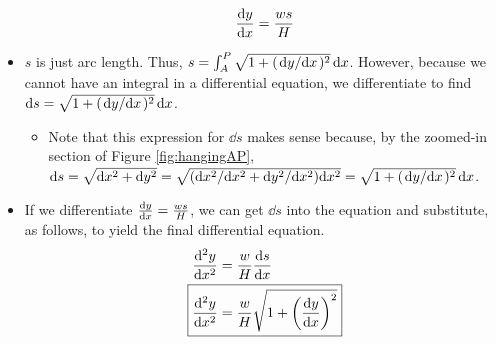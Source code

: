 \documentclass[../main.tex]{subfiles}
\begin{document}
\begin{itemize}
\begin{equation*}
        \dv{y}{x} = \frac{ws}{H}
    \end{equation*}
    \item $s$ is just arc length. Thus, $s=\int_A^P\sqrt{1+(\dv*{y}{x})^2}\dd{x}$. However, because we cannot have an integral in a differential equation, we differentiate to find $\dd s = \sqrt{1+(\dv*{y}{x})^2}\dd{x}$.
    \begin{itemize}
        \item Note that this expression for $\dd s$ makes sense because, by the zoomed-in section of Figure \ref{fig:hangingAP}, $\dd s = \sqrt{\dd x^2+\dd y^2} = \sqrt{(\dd x^2/\dd x^2+\dd y^2/\dd x^2)\dd x^2} = \sqrt{1+(\dv*{y}{x})^2}\dd{x}$.
    \end{itemize}
    \item If we differentiate $\dv{y}{x} = \frac{ws}{H}$, we can get $\dd s$ into the equation and substitute, as follows, to yield the final differential equation.
    \begin{align*}
        \dv[2]{y}{x} &= \frac{w}{H}\dv{s}{x}\\
        \Aboxed{\dv[2]{y}{x} &= \frac{w}{H}\sqrt{1+\left( \dv{y}{x} \right)^2}}
    \end{align*}
\end{itemize}
\end{document}
